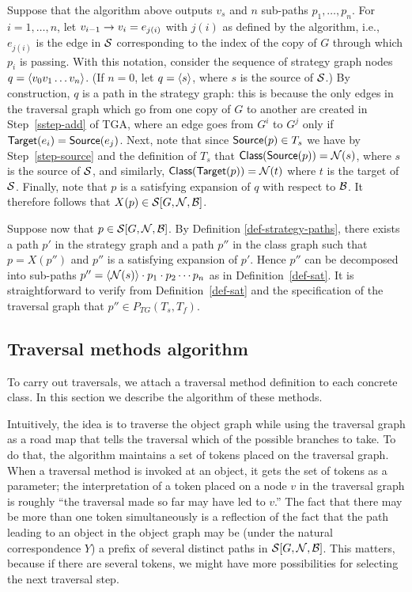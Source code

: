 Suppose that the algorithm above outputs $v_s$ and $n$ sub-paths
$p_1,\ldots,p_n$.  For $i=1,\ldots,n$, let
$v_{i-1}\stackrel{}{\rightarrow}v_i=e_{j(i)}$ with $j(i)$ as defined by the
algorithm, i.e., $e_{j(i)}$ is the edge in ${\cal S}$ corresponding to the
index of the copy of $G$ through which $p_i$ is passing.  With this
notation, consider the sequence of strategy graph nodes
$q=\left\langle v_0v_1\ldots v_n \right\rangle$.  (If $n=0$, let $q=\left\langle s \right\rangle$, where $s$ is
the source of ${\cal S}$.)  By construction, $q$ is a path in the strategy
graph: this is because the only edges in the traversal graph which go
from one copy of $G$ to another are created in Step~\ref{sstep-add}
of TGA, where an edge goes from $G^{i}$ to $G^{j}$ only if
$\mbox{\sf Target}(e_{i})=\mbox{\sf Source}(e_{j})$.  Next, note that since $\mbox{\sf Source}(p)\in
T_s$ we have by Step~\ref{step-source} and the definition of
$T_s$ that $\mbox{\sf Class}(\mbox{\sf Source}(p))={\cal N}(s)$, where $s$ is the source of
${\cal S}$, and similarly, $\mbox{\sf Class}(\mbox{\sf Target}(p))={\cal N}(t)$ where $t$ is the
target of ${\cal S}$.  Finally, note that $p$ is a satisfying expansion of
$q$ with respect to ${\cal B}$.  It therefore follows that $X(p)\in
{\cal S}[G,{\cal N},{\cal B}]$.

Suppose now that $p\in {\cal S}[G,{\cal N},{\cal B}]$. By Definition
\ref{def-strategy-paths}, there exists a path $p'$ in the strategy
graph and a path $p''$ in the class graph such that $p=X(p'')$ and
$p''$ is a satisfying expansion of $p'$.  Hence $p''$ can be
decomposed into sub-paths $p''=\left\langle {\cal N}(s) \right\rangle\cdot p_1\cdot p_2\cdots
p_n$ as in Definition~\ref{def-sat}. It is straightforward to verify
from Definition~\ref{def-sat} and the specification of the traversal
graph that $p''\in P_{TG}(T_s,T_f)$.
\QED


\subsection{Traversal methods algorithm}
\label{ssec-TM}
To carry out traversals, we attach a traversal method definition to
each concrete class. In this section we describe the algorithm of
these methods.

Intuitively, the idea is to traverse the object graph while using the
traversal graph as a road map that tells the traversal which of the
possible branches to take.  To do that, the algorithm maintains a set
of tokens placed on the traversal graph.  When a traversal method is
invoked at an object, it gets the set of tokens as a parameter; the
interpretation of a token placed on a node $v$ in the traversal graph
is roughly ``the traversal made so far may have led to $v$.''  The
fact that there may be more than one token simultaneously is a
reflection of the fact that the path leading to an object in the
object graph may be (under the natural correspondence $Y$) a prefix of
several distinct paths in ${\cal S}[G,{\cal N},{\cal B}]$.  This matters, because
if there are several tokens, we might have more possibilities for
selecting the next traversal step.

